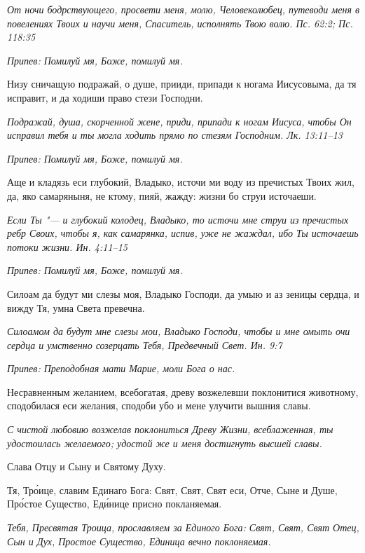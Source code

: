 \itshape От ночи бодрствующего, просвети меня, молю, Человеколюбец, путеводи меня в повелениях Твоих и научи меня, Спаситель, исполнять Твою волю. Пс. 62:2; Пс. 118:35\normalfont{}


\itshape Припев:\normalfont{} Помилуй мя, Боже, помилуй мя.


Низу сничащую подражай, о душе, прииди, припади к ногама Иисусовыма, да тя исправит, и да ходиши право стези Господни.


\itshape Подражай, душа, скорченной жене, приди, припади к ногам Иисуса, чтобы Он исправил тебя и ты могла ходить прямо по стезям Господним. Лк. 13:11–13\normalfont{}


\itshape Припев:\normalfont{} Помилуй мя, Боже, помилуй мя.


Аще и кладязь еси глубокий, Владыко, источи ми воду из пречистых Твоих жил, да, яко самаряныня, не ктому, пияй, жажду: жизни бо струи источаеши.


\itshape Если Ты "--- и глубокий колодец, Владыко, то источи мне струи из пречистых ребр Своих, чтобы я, как самарянка, испив, уже не жаждал, ибо Ты источаешь потоки жизни. Ин. 4:11–15\normalfont{}


\itshape Припев:\normalfont{} Помилуй мя, Боже, помилуй мя.


Силоам да будут ми слезы моя, Владыко Господи, да умыю и аз зеницы сердца, и вижду Тя, умна Света превечна.


\itshape Силоамом да будут мне слезы мои, Владыко Господи, чтобы и мне омыть очи сердца и умственно созерцать Тебя, Предвечный Свет. Ин. 9:7\normalfont{}


\itshape Припев:\normalfont{} Преподобная мати Марие, моли Бога о нас.


Несравненным желанием, всебогатая, древу возжелевши поклонитися животному, сподобилася еси желания, сподоби убо и мене улучити вышния славы.


\itshape С чистой любовию возжелав поклониться Древу Жизни, всеблаженная, ты удостоилась желаемого; удостой же и меня достигнуть высшей славы.\normalfont{}


Слава Отцу и Сыну и Святому Духу.


Тя, Тро́ице, славим Единаго Бога: Свят, Свят, Свят еси, Отче, Сыне и Душе, Про́стое Существо, Еди́нице присно покланяемая.


\itshape Тебя, Пресвятая Троица, прославляем за Единого Бога: Свят, Свят, Свят Отец, Сын и Дух, Простое Существо, Единица вечно поклоняемая.\normalfont{}


